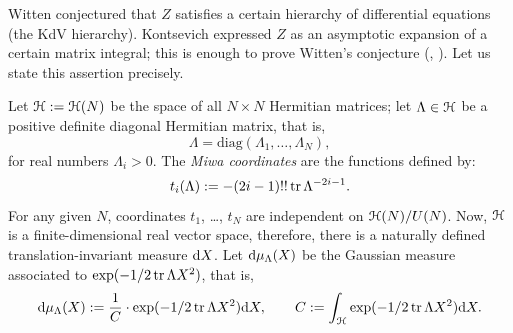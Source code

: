 Witten \cite{witten;intersection-theory} conjectured that $Z$ satisfies
a certain hierarchy of differential equations (the KdV hierarchy).
Kontsevich \cite{kontsevich;intersection-theory;1992} expressed $Z$ as
an asymptotic expansion of a certain matrix integral; this is enough
to prove Witten's conjecture
(\cite{kontsevich;intersection-theory;1992},
\cite{witten;kontsevich-model}). Let us state this assertion
precisely.

Let $\Hn := \Hermitian[N]$ be the space of all $N \times N$ Hermitian
matrices; let $\Lambda \in \mathcal{H}$ be a positive definite diagonal
Hermitian matrix, that is,
\begin{equation*}
  \Lambda = \text{diag}( \Lambda_1, \ldots, \Lambda_N ),
\end{equation*}
for real numbers $\Lambda_i > 0$. The \emph{Miwa coordinates} are the
functions defined by:
\begin{equation*}
  t_i (\Lambda) := -(2i-1)!! \operatorname{tr} \Lambda^{-2i-1}.
\end{equation*}
For any given $N$, coordinates $t_1$, \ldots, $t_N$ are independent on
$\Hermitian[N]/U(N)$. Now, $\mathcal{H}$ is a finite-dimensional real vector
space, therefore, there is a naturally defined translation-invariant
measure $\mathrm{d} X$. Let $\mathrm{d}\mu_\Lambda(X)$ be the Gaussian measure associated
to $\exp ( -1/2 \operatorname{tr} \Lambda X^2)$, that is,
\begin{equation*}
  \mathrm{d} \mu_\Lambda(X) := \frac{1}{C} \cdot \exp ( -1/2 \operatorname{tr} \Lambda X^2)
  \mathrm{d} X, \qquad C := \int_{\mathcal{H}}  \exp ( -1/2 \operatorname{tr} \Lambda X^2) \mathrm{d} X.
\end{equation*}

